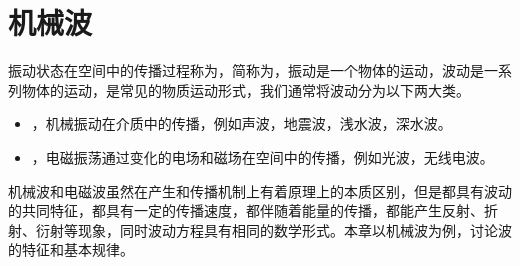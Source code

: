 \chapter{机械波}

振动状态在空间中的传播过程称为，简称为，振动是一个物体的运动，波动是一系列物体的运动，是常见的物质运动形式，我们通常将波动分为以下两大类。
\begin{itemize}
    \item {}，机械振动在介质中的传播，例如声波，地震波，浅水波，深水波。
    \item {}，电磁振荡通过变化的电场和磁场在空间中的传播，例如光波，无线电波。
\end{itemize}
机械波和电磁波虽然在产生和传播机制上有着原理上的本质区别，但是都具有波动的共同特征，都具有一定的传播速度，都伴随着能量的传播，都能产生反射、折射、衍射等现象，同时波动方程具有相同的数学形式。本章以机械波为例，讨论波的特征和基本规律。


